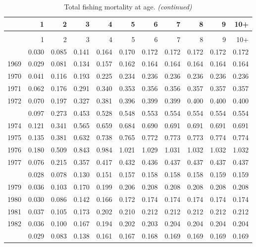 \documentclass[
]{article}
\begin{document}
\begin{longtable}[t]{lrrrrrrrrrr}
\caption{\label{tab:FAA-tot-table}Total fishing mortality at age.}\\
\toprule
  & 1 & 2 & 3 & 4 & 5 & 6 & 7 & 8 & 9 & 10+\\
\midrule
\endfirsthead
\caption[]{Total fishing mortality at age. \textit{(continued)}}\\
\toprule
  & 1 & 2 & 3 & 4 & 5 & 6 & 7 & 8 & 9 & 10+\\
\midrule
\endhead

\endfoot
\bottomrule
\endlastfoot
1968 & 0.030 & 0.085 & 0.141 & 0.164 & 0.170 & 0.172 & 0.172 & 0.172 & 0.172 & 0.172\\
1969 & 0.029 & 0.081 & 0.134 & 0.157 & 0.162 & 0.164 & 0.164 & 0.164 & 0.164 & 0.164\\
1970 & 0.041 & 0.116 & 0.193 & 0.225 & 0.234 & 0.236 & 0.236 & 0.236 & 0.236 & 0.236\\
1971 & 0.062 & 0.176 & 0.291 & 0.340 & 0.353 & 0.356 & 0.356 & 0.357 & 0.357 & 0.357\\
1972 & 0.070 & 0.197 & 0.327 & 0.381 & 0.396 & 0.399 & 0.399 & 0.400 & 0.400 & 0.400\\
\addlinespace
1973 & 0.097 & 0.273 & 0.453 & 0.528 & 0.548 & 0.553 & 0.554 & 0.554 & 0.554 & 0.554\\
1974 & 0.121 & 0.341 & 0.565 & 0.659 & 0.684 & 0.690 & 0.691 & 0.691 & 0.691 & 0.691\\
1975 & 0.135 & 0.381 & 0.632 & 0.738 & 0.765 & 0.772 & 0.773 & 0.773 & 0.774 & 0.774\\
1976 & 0.180 & 0.509 & 0.843 & 0.984 & 1.021 & 1.029 & 1.031 & 1.032 & 1.032 & 1.032\\
1977 & 0.076 & 0.215 & 0.357 & 0.417 & 0.432 & 0.436 & 0.437 & 0.437 & 0.437 & 0.437\\
\addlinespace
1978 & 0.028 & 0.078 & 0.130 & 0.151 & 0.157 & 0.158 & 0.158 & 0.158 & 0.159 & 0.159\\
1979 & 0.036 & 0.103 & 0.170 & 0.199 & 0.206 & 0.208 & 0.208 & 0.208 & 0.208 & 0.208\\
1980 & 0.030 & 0.086 & 0.142 & 0.166 & 0.172 & 0.174 & 0.174 & 0.174 & 0.174 & 0.174\\
1981 & 0.037 & 0.105 & 0.173 & 0.202 & 0.210 & 0.212 & 0.212 & 0.212 & 0.212 & 0.212\\
1982 & 0.036 & 0.100 & 0.167 & 0.194 & 0.202 & 0.203 & 0.204 & 0.204 & 0.204 & 0.204\\
\addlinespace
1983 & 0.029 & 0.083 & 0.138 & 0.161 & 0.167 & 0.168 & 0.169 & 0.169 & 0.169 & 0.169\\

\end{longtable}
\end{document}
